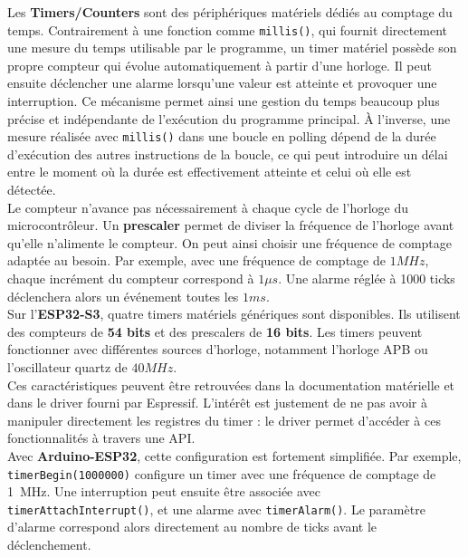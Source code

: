 Les \textbf{Timers/Counters} sont des périphériques matériels dédiés au comptage du temps. Contrairement à une fonction comme \texttt{millis()}, qui fournit directement une mesure du temps utilisable par le programme, un timer matériel possède son propre compteur qui évolue automatiquement à partir d'une horloge. Il peut ensuite déclencher une alarme lorsqu'une valeur est atteinte et provoquer une interruption. Ce mécanisme permet ainsi une gestion du temps beaucoup plus précise et indépendante de l'exécution du programme principal. À l'inverse, une mesure réalisée avec \texttt{millis()} dans une boucle en polling dépend de la durée d'exécution des autres instructions de la boucle, ce qui peut introduire un délai entre le moment où la durée est effectivement atteinte et celui où elle est détectée.\\

Le compteur n'avance pas nécessairement à chaque cycle de l'horloge du microcontrôleur. Un \textbf{prescaler} permet de diviser la fréquence de l'horloge avant qu'elle n'alimente le compteur. On peut ainsi choisir une fréquence de comptage adaptée au besoin. Par exemple, avec une fréquence de comptage de $1 MHz$, chaque incrément du compteur correspond à $1 \mu s$. Une alarme réglée à 1000 ticks déclenchera alors un événement toutes les $1ms$.\\

Sur l'\textbf{ESP32-S3}, quatre timers matériels génériques sont disponibles. Ils utilisent des compteurs de \textbf{54 bits} et des prescalers de \textbf{16 bits}. Les timers peuvent fonctionner avec différentes sources d'horloge, notamment l'horloge APB ou l'oscillateur quartz de $40 MHz$. \\

Ces caractéristiques peuvent être retrouvées dans la documentation matérielle et dans le driver fourni par Espressif. L'intérêt est justement de ne pas avoir à manipuler directement les registres du timer : le driver permet d'accéder à ces fonctionnalités à travers une API.\\

Avec \textbf{Arduino-ESP32}, cette configuration est fortement simplifiée. Par exemple, \texttt{timerBegin(1000000)} configure un timer avec une fréquence de comptage de 1~MHz. Une interruption peut ensuite être associée avec \texttt{timerAttachInterrupt()}, et une alarme avec \texttt{timerAlarm()}. Le paramètre d'alarme correspond alors directement au nombre de ticks avant le déclenchement. \cite{arduino_timer} \\

